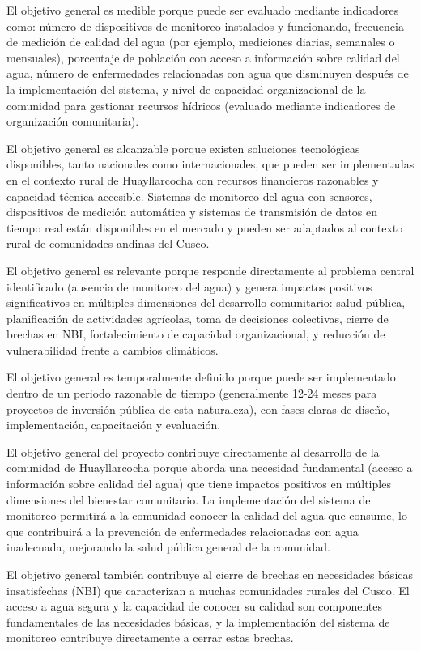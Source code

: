 El objetivo general es medible porque puede ser evaluado mediante indicadores como: número de dispositivos de monitoreo instalados y funcionando, frecuencia de medición de calidad del agua (por ejemplo, mediciones diarias, semanales o mensuales), porcentaje de población con acceso a información sobre calidad del agua, número de enfermedades relacionadas con agua que disminuyen después de la implementación del sistema, y nivel de capacidad organizacional de la comunidad para gestionar recursos hídricos (evaluado mediante indicadores de organización comunitaria).

El objetivo general es alcanzable porque existen soluciones tecnológicas disponibles, tanto nacionales como internacionales, que pueden ser implementadas en el contexto rural de Huayllarcocha con recursos financieros razonables y capacidad técnica accesible. Sistemas de monitoreo del agua con sensores, dispositivos de medición automática y sistemas de transmisión de datos en tiempo real están disponibles en el mercado y pueden ser adaptados al contexto rural de comunidades andinas del Cusco.

El objetivo general es relevante porque responde directamente al problema central identificado (ausencia de monitoreo del agua) y genera impactos positivos significativos en múltiples dimensiones del desarrollo comunitario: salud pública, planificación de actividades agrícolas, toma de decisiones colectivas, cierre de brechas en NBI, fortalecimiento de capacidad organizacional, y reducción de vulnerabilidad frente a cambios climáticos.

El objetivo general es temporalmente definido porque puede ser implementado dentro de un periodo razonable de tiempo (generalmente 12-24 meses para proyectos de inversión pública de esta naturaleza), con fases claras de diseño, implementación, capacitación y evaluación.

El objetivo general del proyecto contribuye directamente al desarrollo de la comunidad de Huayllarcocha porque aborda una necesidad fundamental (acceso a información sobre calidad del agua) que tiene impactos positivos en múltiples dimensiones del bienestar comunitario. La implementación del sistema de monitoreo permitirá a la comunidad conocer la calidad del agua que consume, lo que contribuirá a la prevención de enfermedades relacionadas con agua inadecuada, mejorando la salud pública general de la comunidad.

El objetivo general también contribuye al cierre de brechas en necesidades básicas insatisfechas (NBI) que caracterizan a muchas comunidades rurales del Cusco. El acceso a agua segura y la capacidad de conocer su calidad son componentes fundamentales de las necesidades básicas, y la implementación del sistema de monitoreo contribuye directamente a cerrar estas brechas.

